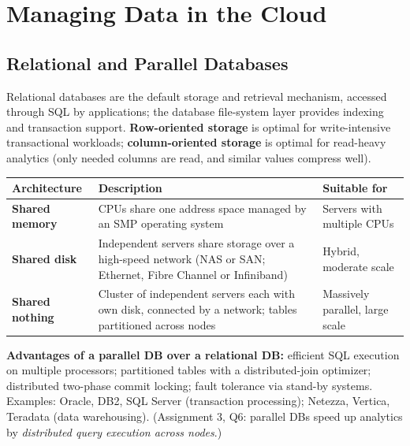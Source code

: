\documentclass[11pt,a4paper,openany]{report}
\begin{document}
\section{Managing Data in the Cloud}
\subsection{Relational and Parallel Databases}
Relational databases are the default storage and retrieval mechanism, accessed through SQL by applications; the
database file-system layer provides indexing and transaction support. \textbf{Row-oriented storage} is optimal
for write-intensive transactional workloads; \textbf{column-oriented storage} is optimal for read-heavy analytics
(only needed columns are read, and similar values compress well).

\begin{center}
\begin{tabularx}{\textwidth}{>{\bfseries}lXX}
\toprule
Architecture & Description & Suitable for\\
\midrule
Shared memory & CPUs share one address space managed by an SMP operating system & Servers with multiple CPUs\\
Shared disk & Independent servers share storage over a high-speed network (NAS or SAN; Ethernet, Fibre Channel or Infiniband)
& Hybrid, moderate scale\\
Shared nothing & Cluster of independent servers each with own disk, connected by a network; tables partitioned across nodes &
Massively parallel, large scale\\
\bottomrule
\end{tabularx}
\end{center}
\textbf{Advantages of a parallel DB over a relational DB:} efficient SQL execution on multiple processors; partitioned tables with a
distributed-join optimizer; distributed two-phase commit locking; fault tolerance via stand-by systems.
Examples: Oracle, DB2, SQL Server (transaction processing); Netezza, Vertica, Teradata (data warehousing).
(Assignment 3, Q6: parallel DBs speed up analytics by \emph{distributed query execution across nodes}.)
\end{document}
